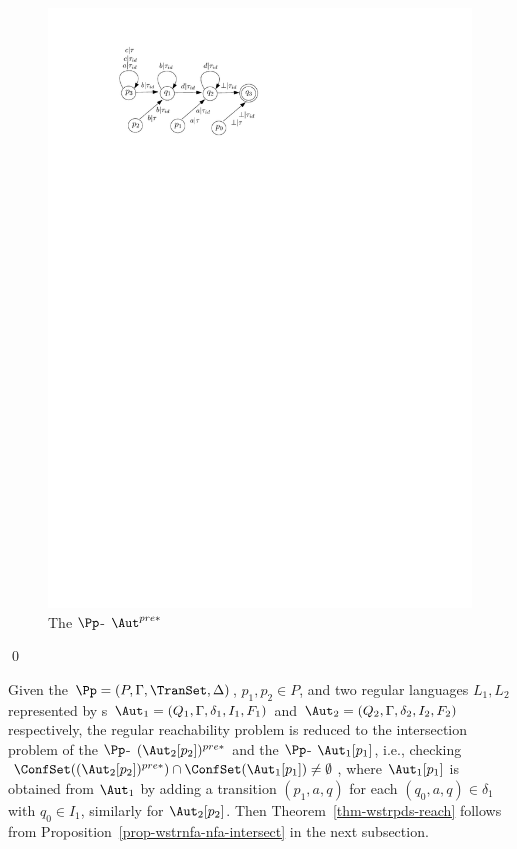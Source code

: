 \begin{example}
\begin{figure}[htb]
	\includegraphics[scale = 0.9]{saturation-example.pdf}
	\caption{The $\Pp$-{\WOTrNFA} $\Aut^{pre*}$}\label{fig-saturation-exmp}
\end{figure}
\qed
\end{example}

Given the {\WOTrPDS} $\Pp= (P, \Gamma, \TranSet, \Delta)$, $p_1, p_2 \in P$, and two regular languages $L_1, L_2$ represented by {\NFA}s $\Aut_1 = (Q_1, \Gamma, \delta_1, I_1, F_1)$ and $\Aut_2 = (Q_2, \Gamma, \delta_2, I_2, F_2)$ respectively, the regular reachability problem is reduced to the intersection problem of the $\Pp$-{\WOTrNFA} $(\Aut_2[p_2])^{pre*}$ and the $\Pp$-{\NFA} $\Aut_1[p_1]$, 
i.e., checking $\ConfSet((\Aut_2[p_2])^{pre*}) \cap \ConfSet(\Aut_1[p_1]) \neq \emptyset$, where $\Aut_1[p_1]$ is obtained from $\Aut_1$ by adding a transition $(p_1, a, q)$ for each $(q_0, a, q) \in \delta_1$ with $q_0 \in I_1$, similarly for $\Aut_2[p_2]$. Then Theorem~\ref{thm-wstrpds-reach} follows from Proposition~\ref{prop-wstrnfa-nfa-intersect} in the next subsection.


